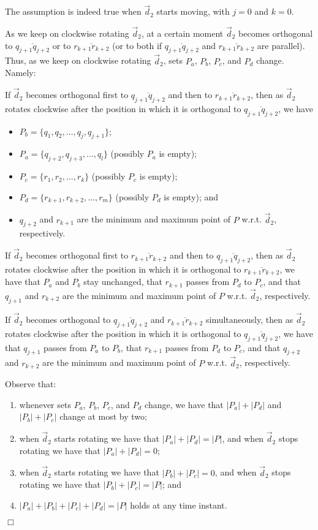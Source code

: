 \documentclass{llncs}
\renewenvironment{proof}
{{\bf Proof:}}{\hspace*{\fill}$\Box$\par\vspace{2mm}}
\begin{document}
\begin{proof}
The assumption is indeed true when ${\vec d}_2$ starts moving, with $j=0$ and $k=0$.

As we keep on clockwise rotating ${\vec d}_2$, at a certain moment ${\vec d}_2$ becomes orthogonal to $\overline{q_{j+1}q_{j+2}}$ or to $\overline{r_{k+1}r_{k+2}}$ (or to both if $\overline{q_{j+1}q_{j+2}}$ and $\overline{r_{k+1}r_{k+2}}$ are parallel). Thus, as we keep on clockwise rotating ${\vec d}_2$, sets $P_a$, $P_b$, $P_c$, and $P_d$ change. Namely:

If ${\vec d}_2$ becomes orthogonal first to $\overline{q_{j+1}q_{j+2}}$ and then to $\overline{r_{k+1}r_{k+2}}$, then as ${\vec d}_2$ rotates clockwise after the position in which it is orthogonal to $\overline{q_{j+1}q_{j+2}}$, we have

\begin{itemize}
\item $P_b=\{q_1,q_2,\dots,q_j,q_{j+1}\}$;
\item $P_a=\{q_{j+2},q_{j+3},\dots,q_l\}$ (possibly $P_a$ is empty);
\item $P_c=\{r_1,r_2,\dots,r_k\}$ (possibly $P_c$ is empty);
\item $P_d=\{r_{k+1},r_{k+2},\dots,r_m\}$ (possibly $P_d$ is empty); and
\item $q_{j+2}$ and $r_{k+1}$ are the minimum and maximum point of $P$ w.r.t. ${\vec d}_2$, respectively.
\end{itemize}


If ${\vec d}_2$ becomes orthogonal first to $\overline{r_{k+1}r_{k+2}}$ and then to $\overline{q_{j+1}q_{j+2}}$, then as ${\vec d}_2$ rotates clockwise after the position in which it is orthogonal to $\overline{r_{k+1}r_{k+2}}$, we have that $P_a$ and $P_b$ stay unchanged, that $r_{k+1}$ passes from $P_d$ to $P_c$, and that $q_{j+1}$ and $r_{k+2}$ are the minimum and maximum point of $P$ w.r.t. ${\vec d}_2$, respectively.


If ${\vec d}_2$ becomes orthogonal to $\overline{q_{j+1}q_{j+2}}$ and $\overline{r_{k+1}r_{k+2}}$ simultaneously, then as ${\vec d}_2$ rotates clockwise after the position in which it is orthogonal to  $\overline{q_{j+1}q_{j+2}}$, we have that $q_{j+1}$ passes from $P_a$ to $P_b$, that $r_{k+1}$ passes from $P_d$ to $P_c$, and that $q_{j+2}$ and $r_{k+2}$ are the minimum and maximum point of $P$ w.r.t. ${\vec d}_2$, respectively.

Observe that:
\begin{enumerate}
\item whenever sets $P_a$, $P_b$, $P_c$, and $P_d$ change, we have that $|P_a|+|P_d|$ and $|P_b|+|P_c|$ change at most by two;
\item when ${\vec d}_2$ starts rotating we have that $|P_a|+|P_d|=|P|$, and when ${\vec d}_2$ stops rotating we have that $|P_a|+|P_d|=0$;
\item when ${\vec d}_2$ starts rotating we have that  $|P_b|+|P_c|=0$, and when ${\vec d}_2$ stops rotating we have that $|P_b|+|P_c|=|P|$; and
\item $|P_a|+|P_b|+|P_c|+|P_d|=|P|$ holds at any time instant.
\end{enumerate}


\end{proof}
\end{document}
